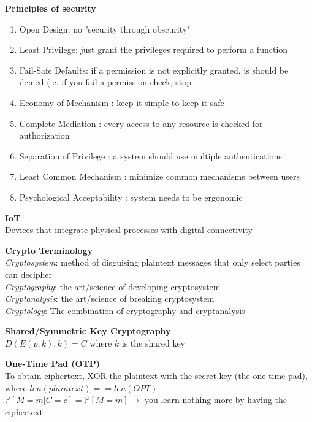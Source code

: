 \documentclass[10pt,letterpaper,landscape]{report}
\newcommand{\boxheight}{21.59cm}
\newcommand{\boxwidth}{8.85cm}
\begin{document}
\begin{small}
{\begin{minipage}[t][\boxheight][c]{\boxwidth}
	\textbf{Principles of security}
	\begin{enumerate}
		\item Open Design: no "security through obscurity"
		\item Least Privilege: just grant the privileges required to perform a function
		\item Fail-Safe Defaults: if a permission is not explicitly granted, is should be denied (ie. if you fail a permission check, stop
		\item Economy of Mechanism : keep it simple to keep it safe
		\item Complete Mediation : every access to any resource is checked for authorization
		\item Separation of Privilege : a system should use multiple authentications
		\item Least Common Mechanism : minimize common mechanisms between users
		\item Psychological Acceptability : system needs to be ergonomic
	\end{enumerate}

	\textbf{IoT}\\
	Devices that integrate physical processes with digital connectivity
	
	\textbf{Crypto Terminology}\\
	\textit{Cryptosystem}: method of disguising plaintext messages that only select parties can decipher\\
	\textit{Cryptography}: the art/science of developing cryptosystem\\
	\textit{Cryptanalysis}: the art/science of breaking cryptosystem\\
	\textit{Cryptology}: The combination of cryptography and cryptanalysis
	
	\textbf{Shared/Symmetric Key Cryptography}\\
	$D(E(p,k),k) = C$ where $k$ is the shared key
	
	\textbf{One-Time Pad (OTP)}\\
	To obtain ciphertext, XOR the plaintext with the secret key (the one-time pad), where $len(plaintext) == len(OPT)$\\
	$\mathbb{P}[M=m\vert C=c] = \mathbb{P}[M=m] \rightarrow$ you learn nothing more by having the ciphertext
	



\end{minipage}
}\fbox{
\begin{minipage}[t][\boxheight][c]{\boxwidth}



\end{minipage}}
\end{small}
\end{document}
